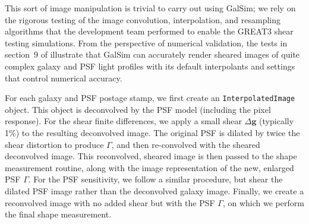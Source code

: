 \documentclass[iop]{emulateapj}
\newcommand\rmcomment[1]{\textcolor{red}{(RM: #1)}}
\begin{document}
This sort of image manipulation is trivial to carry out using GalSim;
we rely on the rigorous testing of the image convolution,
interpolation, and resampling algorithms that the development team
performed to enable the GREAT3 shear testing simulations.  From the
perspective of numerical validation, the tests in section~9 of
\cite{2015A&C....10..121R} illustrate that GalSim can accurately
render sheared images of quite complex galaxy and PSF light profiles
with its default interpolants and settings that control numerical accuracy.

For each galaxy and PSF postage stamp, we first create an
\texttt{InterpolatedImage} object. This object is deconvolved by the
PSF model (including the pixel response). For the shear finite
differences, we apply a small shear $\Delta\mathbf{g}$ (typically 1\%)
to the resulting deconvolved image. The original PSF is dilated by
twice the shear distortion to produce $\Gamma$, and then re-convolved
with the sheared deconvolved image. This reconvolved, sheared image is
then passed to the shape measurement routine, along with the image
representation of the new, enlarged PSF $\Gamma$. For the PSF
sensitivity, we follow a similar procedure, but shear the dilated PSF
image rather than the deconvolved galaxy image. Finally, we create a
reconvolved image with no added shear but with the PSF $\Gamma$, on
which we perform the final shape measurement.

\end{document}
